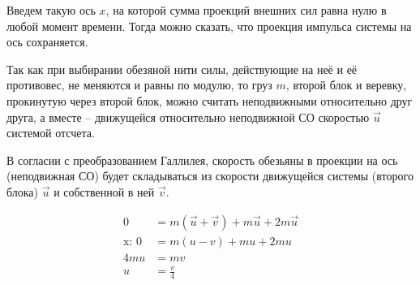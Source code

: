 \documentclass[a5paper,10pt]{article}\usepackage[usenames,dvipsnames]{color}\usepackage{extsizes,cmap,graphicx,misccorr,indentfirst,makecell,multirow,ulem,geometry,amssymb,amsfonts,amsmath,amsthm,titlesec,float,fancyhdr,wrapfig,tikz}\usepackage[T2A]{fontenc}\usepackage[utf8x]{inputenc}\usepackage[english, russian]{babel}\usetikzlibrary{decorations.pathreplacing,decorations.pathmorphing,patterns,calc,scopes,arrows,through,positioning,shapes.misc}\graphicspath{{img/}}\linespread{1.3}\frenchspacing\geometry{left=1cm, right=1cm, top=2cm, bottom=1cm, bindingoffset=0cm}\pagestyle{fancy}\fancyhead{}\fancyhead[R]{Сарафанов Ф.Г.}
\begin{document}
Введем такую ось $x$, на которой сумма проекций внешних сил равна нулю в любой момент времени. Тогда можно сказать, что проекция импульса системы на ось сохраняется.


Так как при выбирании обезяной нити силы, действующие на неё и её противовес, не меняются и равны по модулю, то груз $m$, второй блок и веревку, прокинутую через второй блок, можно считать неподвижными относительно друг друга, а вместе -- движущейся относительно неподвижной СО скоростью $\vec{u}$ системой отсчета. 

В согласии с преобразованием Галлилея, скорость обезьяны в проекции на ось (неподвижная СО) будет складываться из скорости движущейся системы (второго блока) $\vec{u}$ и собственной в ней $\vec{v}$.


\begin{align*}
    0&=m(\vec{u}+\vec{v})+m\vec{u}+2m\vec{u}\\
    \text{x: \ \ }0&=m(u-v)+mu+2mu\\
    4mu&=mv\\
    u&=\frac{v}{4}
\end{align*}

\end{document}
